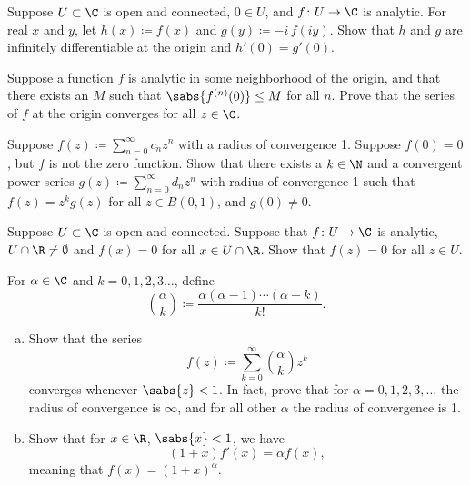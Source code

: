 \begin{exercise}
Suppose $U \subset \C$ is open and connected, $0 \in U$, and $f \colon U
\to \C$ is analytic.  For real $x$ and $y$,
let $h(x) \coloneqq f(x)$ and $g(y) \coloneqq -i \, f(iy)$.
Show that $h$ and $g$ are infinitely differentiable at the origin and
$h'(0) = g'(0)$.
\end{exercise}

\begin{exercise}
Suppose a function $f$ is analytic in some neighborhood of the origin,
and that there exists an $M$
such that $\sabs{f^{(n)}(0)} \leq M$ for all $n$.
Prove that the series of $f$ at the origin converges for all $z \in \C$.
\end{exercise}

\begin{exercise}
Suppose $f(z) \coloneqq \sum_{n=0}^\infty c_n z^n$ with a radius of convergence 1.  Suppose $f(0)
= 0$, but $f$ is not the zero function.
Show that there exists a $k \in \N$ and a convergent
power series $g(z) \coloneqq \sum_{n=0}^\infty d_n z^n$ with radius of convergence 1
such that $f(z) = z^k g(z)$ for all $z \in B(0,1)$, and $g(0) \not= 0$.
\end{exercise}

\begin{exercise}
Suppose $U \subset \C$ is open and connected.  Suppose that
$f \colon U \to \C$ is analytic, $U \cap \R \not= \emptyset$ and
$f(x) = 0$ for all $x \in U \cap \R$.  Show that $f(z) = 0$ for all $z \in
U$.
\end{exercise}

\begin{exercise}
For $\alpha \in \C$ and $k=0,1,2,3\ldots$, define
\begin{equation*}
\binom{\alpha}{k} \coloneqq \frac{\alpha(\alpha-1)\cdots(\alpha-k)}{k!} .
\end{equation*}
\begin{enumerate}[a)]
\item
Show that the series
\begin{equation*}
f(z) \coloneqq \sum_{k=0}^\infty \binom{\alpha}{k} z^k
\end{equation*}
converges whenever $\sabs{z} < 1$.
In fact, prove that for $\alpha = 0,1,2,3,\ldots$ the radius of
convergence is $\infty$, and for all other $\alpha$
the radius of convergence is 1.
\item
Show that for $x \in \R$, $\sabs{x} < 1$, we have
\begin{equation*}
(1+x) f'(x) = \alpha f(x) ,
\end{equation*}
meaning that $f(x) = (1+x)^\alpha$.
\end{enumerate}
\end{exercise}

